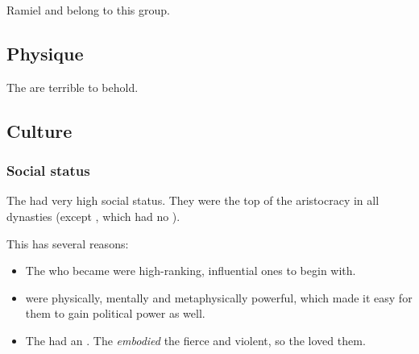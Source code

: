 Ramiel and \Shiaraid{} belong to this group.









\subsection{Physique}
The \satharioth{} are terrible to behold. 










\subsection{Culture}





\subsubsection{Social status}
The \satharioth had very high social status. 
They were the top of the \resphan aristocracy in all dynasties (except \Baelzerach, which had no \satharioth). 

This has several reasons:
\begin{itemize}
  \item 
    The \resphain who became \satharioth were high-ranking, influential ones to begin with.
  \item 
    \Satharioth were physically, mentally and metaphysically powerful, which made it easy for them to gain political power as well.
  \item 
    The \resphain had an . 
    The \satharioth \emph{embodied} the fierce and violent, so the \resphain loved them. 
\end{itemize}












